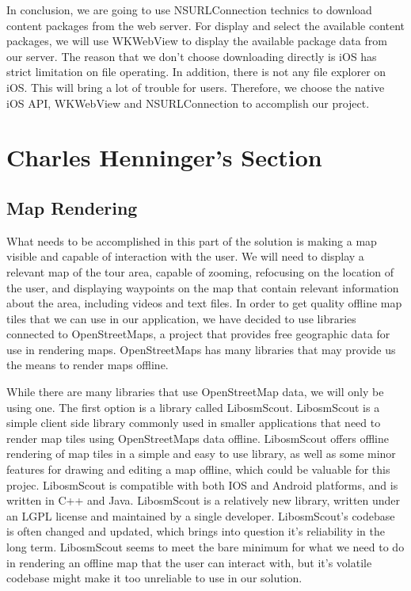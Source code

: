 \documentclass[letterpaper, 10pt,titlepage]{article}
\begin{document}
In conclusion, we are going to use NSURLConnection technics to download content packages from the web server. For display and select the available content packages, we will use WKWebView to display the available package data from our server. The reason that we don’t choose downloading directly is iOS has strict limitation on file operating. In addition, there is not any file explorer on iOS. This will bring a lot of trouble for users. Therefore, we choose the native iOS API, WKWebView and NSURLConnection to accomplish our project.

\vspace{0.5cm}


\section{Charles Henninger's Section}
\subsection{Map Rendering}
What needs to be accomplished in this part of the solution is making a map visible and capable of interaction with the user. We will need to display a relevant map of the tour area, capable of zooming, refocusing on the location of the user, and displaying waypoints on the map that contain relevant information about the area, including videos and text files. In order to get quality offline map tiles that we can use in our application, we have decided to use libraries connected to OpenStreetMaps, a project that provides free geographic data for use in rendering maps. OpenStreetMaps has many libraries that may provide us the means to render maps offline.


While there are many libraries that use OpenStreetMap data, we will only be using one. The first option is a library called LibosmScout. LibosmScout is a simple client side library commonly used in smaller applications that need to render map tiles using OpenStreetMaps data offline. LibosmScout offers offline rendering of map tiles in a simple and easy to use library, as well as some minor features for drawing and editing a map offline, which could be valuable for this projec. LibosmScout is compatible with both IOS and Android platforms, and is written in C++ and Java. LibosmScout is a relatively new library, written under an LGPL license and maintained by a single developer. LibosmScout’s codebase is often changed and updated, which brings into question it’s reliability in the long term. LibosmScout seems to meet the bare minimum for what we need to do in rendering an offline map that the user can interact with, but it’s volatile codebase might make it too unreliable to use in our solution. 
\end{document}
